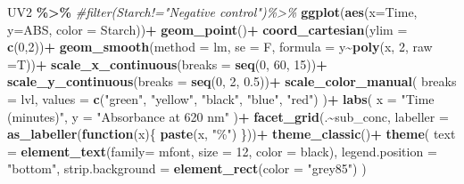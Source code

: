 \documentclass[
  12pt,
]{article}
\newenvironment{Shaded}{\begin{snugshade}}{\end{snugshade}}
\newcommand{\AttributeTok}[1]{\textcolor[rgb]{0.13,0.29,0.53}{#1}}
\newcommand{\CommentTok}[1]{\textcolor[rgb]{0.56,0.35,0.01}{\textit{#1}}}
\newcommand{\ControlFlowTok}[1]{\textcolor[rgb]{0.13,0.29,0.53}{\textbf{#1}}}
\newcommand{\DecValTok}[1]{\textcolor[rgb]{0.00,0.00,0.81}{#1}}
\newcommand{\FloatTok}[1]{\textcolor[rgb]{0.00,0.00,0.81}{#1}}
\newcommand{\FunctionTok}[1]{\textcolor[rgb]{0.13,0.29,0.53}{\textbf{#1}}}
\newcommand{\NormalTok}[1]{#1}
\newcommand{\SpecialCharTok}[1]{\textcolor[rgb]{0.81,0.36,0.00}{\textbf{#1}}}
\newcommand{\StringTok}[1]{\textcolor[rgb]{0.31,0.60,0.02}{#1}}
\begin{document}
\begin{Shaded}
\begin{Highlighting}[]
\NormalTok{UV2 }\SpecialCharTok{\%\textgreater{}\%} 
  \CommentTok{\#filter(Starch!="Negative control")\%\textgreater{}\% }
  \FunctionTok{ggplot}\NormalTok{(}\FunctionTok{aes}\NormalTok{(}\AttributeTok{x=}\NormalTok{Time, }\AttributeTok{y=}\NormalTok{ABS, }\AttributeTok{color =}\NormalTok{ Starch))}\SpecialCharTok{+}
  \FunctionTok{geom\_point}\NormalTok{()}\SpecialCharTok{+}
  \FunctionTok{coord\_cartesian}\NormalTok{(}\AttributeTok{ylim =} \FunctionTok{c}\NormalTok{(}\DecValTok{0}\NormalTok{,}\DecValTok{2}\NormalTok{))}\SpecialCharTok{+}
  \FunctionTok{geom\_smooth}\NormalTok{(}\AttributeTok{method =} \StringTok{\textquotesingle{}lm\textquotesingle{}}\NormalTok{, }\AttributeTok{se =}\NormalTok{ F,}
              \AttributeTok{formula =}\NormalTok{ y}\SpecialCharTok{\textasciitilde{}}\FunctionTok{poly}\NormalTok{(x, }\DecValTok{2}\NormalTok{, }\AttributeTok{raw =}\NormalTok{T))}\SpecialCharTok{+}
  \FunctionTok{scale\_x\_continuous}\NormalTok{(}\AttributeTok{breaks =} \FunctionTok{seq}\NormalTok{(}\DecValTok{0}\NormalTok{, }\DecValTok{60}\NormalTok{, }\DecValTok{15}\NormalTok{))}\SpecialCharTok{+}
  \FunctionTok{scale\_y\_continuous}\NormalTok{(}\AttributeTok{breaks =} \FunctionTok{seq}\NormalTok{(}\DecValTok{0}\NormalTok{, }\DecValTok{2}\NormalTok{, }\FloatTok{0.5}\NormalTok{))}\SpecialCharTok{+}
  \FunctionTok{scale\_color\_manual}\NormalTok{(}
    \AttributeTok{breaks =}\NormalTok{ lvl,}
    \AttributeTok{values =} \FunctionTok{c}\NormalTok{(}\StringTok{"green"}\NormalTok{,}
               \StringTok{"yellow"}\NormalTok{,}
               \StringTok{"black"}\NormalTok{,}
               \StringTok{"blue"}\NormalTok{,}
               \StringTok{"red"}\NormalTok{)}
\NormalTok{  )}\SpecialCharTok{+}
  \FunctionTok{labs}\NormalTok{(}
    \AttributeTok{x =} \StringTok{"Time (minutes)"}\NormalTok{,}
    \AttributeTok{y =} \StringTok{"Absorbance at 620 nm"}
\NormalTok{  )}\SpecialCharTok{+}
  \FunctionTok{facet\_grid}\NormalTok{(.}\SpecialCharTok{\textasciitilde{}}\NormalTok{sub\_conc,}
             \AttributeTok{labeller =} \FunctionTok{as\_labeller}\NormalTok{(}\ControlFlowTok{function}\NormalTok{(x)\{}
               \FunctionTok{paste}\NormalTok{(x, }\StringTok{"\%"}\NormalTok{)}
\NormalTok{             \}))}\SpecialCharTok{+}
  \FunctionTok{theme\_classic}\NormalTok{()}\SpecialCharTok{+}
  \FunctionTok{theme}\NormalTok{(}
    \AttributeTok{text =} \FunctionTok{element\_text}\NormalTok{(}\AttributeTok{family=}\NormalTok{ mfont,}
                        \AttributeTok{size =} \DecValTok{12}\NormalTok{,}
                        \AttributeTok{color =} \StringTok{\textquotesingle{}black\textquotesingle{}}\NormalTok{),}
    \AttributeTok{legend.position =} \StringTok{"bottom"}\NormalTok{,}
    \AttributeTok{strip.background =} \FunctionTok{element\_rect}\NormalTok{(}\AttributeTok{color =} \StringTok{"grey85"}\NormalTok{)}
\NormalTok{    )}
\end{Highlighting}
\end{Shaded}
\end{document}
